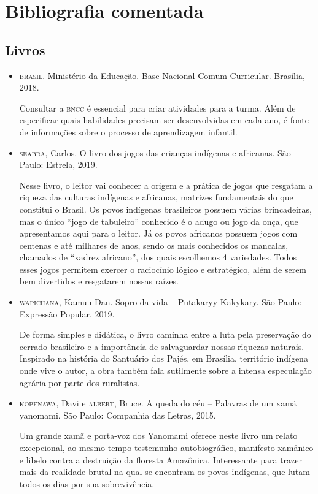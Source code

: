 \documentclass[11pt]{extarticle}
\begin{document}
\section{Bibliografia comentada}
\subsection{Livros}

\begin{itemize}
\item \textsc{brasil}. Ministério da Educação. Base Nacional Comum Curricular. Brasília, 2018.

Consultar a \textsc{bncc} é essencial para criar atividades para a turma. Além de especificar quais habilidades precisam ser desenvolvidas em cada ano, é fonte de informações sobre o processo de aprendizagem infantil. 

\item \textsc{seabra}, Carlos. O livro dos jogos das crianças indígenas e africanas. São Paulo: Estrela, 2019.

Nesse livro, o leitor vai conhecer a origem e a prática de jogos que resgatam a riqueza das culturas indígenas e africanas, matrizes fundamentais do que constitui o Brasil. Os povos indígenas brasileiros possuem várias brincadeiras, mas o único “jogo de tabuleiro” conhecido é o adugo ou jogo da onça, que apresentamos aqui para o leitor. Já os povos africanos possuem jogos com centenas e até milhares de anos, sendo os mais conhecidos os mancalas, chamados de “xadrez africano”, dos quais escolhemos 4 variedades. Todos esses jogos permitem exercer o raciocínio lógico e estratégico, além de serem bem divertidos e resgatarem nossas raízes.
 
\item \textsc{wapichana}, Kamuu Dan. Sopro da vida – Putakaryy Kakykary. São Paulo: Expressão Popular, 2019.

De forma simples e didática, o livro caminha entre a luta pela preservação do cerrado brasileiro e a importância de salvaguardar nossas riquezas naturais. Inspirado na história do Santuário dos Pajés, em Brasília, território indígena onde vive o autor, a obra também fala sutilmente sobre a intensa especulação agrária por parte dos ruralistas.

\item \textsc{kopenawa}, Davi e \textsc{albert}, Bruce. A queda do céu -- Palavras de um xamã yanomami. São Paulo: Companhia das Letras, 2015.

Um grande xamã e porta-voz dos Yanomami oferece neste livro um relato excepcional, ao mesmo tempo testemunho autobiográfico, manifesto xamânico e libelo contra a destruição da floresta Amazônica. Interessante para trazer mais da realidade brutal na qual se encontram os povos indígenas, que lutam todos os dias por sua sobrevivência. 
\end{itemize}
\end{document}

